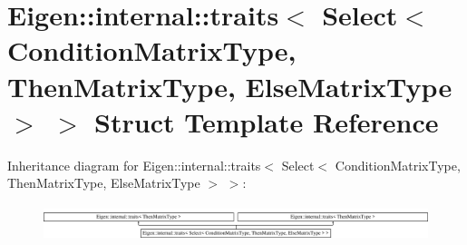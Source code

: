 \hypertarget{struct_eigen_1_1internal_1_1traits_3_01_select_3_01_condition_matrix_type_00_01_then_matrix_type4a832542e824e444643efa2ac02419b2}{}\section{Eigen\+:\+:internal\+:\+:traits$<$ Select$<$ Condition\+Matrix\+Type, Then\+Matrix\+Type, Else\+Matrix\+Type $>$ $>$ Struct Template Reference}
\label{struct_eigen_1_1internal_1_1traits_3_01_select_3_01_condition_matrix_type_00_01_then_matrix_type4a832542e824e444643efa2ac02419b2}
Inheritance diagram for Eigen\+:\+:internal\+:\+:traits$<$ Select$<$ Condition\+Matrix\+Type, Then\+Matrix\+Type, Else\+Matrix\+Type $>$ $>$\+:\begin{figure}[H]
\begin{center}
\leavevmode
\includegraphics[height=1.060606cm]{struct_eigen_1_1internal_1_1traits_3_01_select_3_01_condition_matrix_type_00_01_then_matrix_type4a832542e824e444643efa2ac02419b2}
\end{center}
\end{figure}
